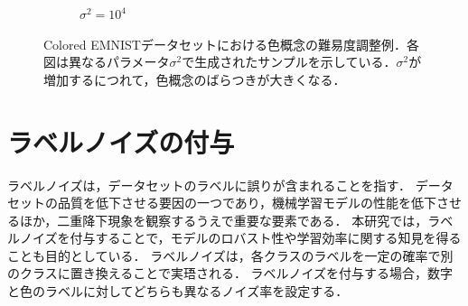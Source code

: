 \begin{figure}[H]
\begin{subfigure}[b]{0.48\textwidth}
        \caption{$\sigma^2 = 10^4$}
        \label{fig:coloredeminst_10000}
    \end{subfigure}
    \caption{Colored EMNISTデータセットにおける色概念の難易度調整例．各図は異なるパラメータ$\sigma^2$で生成されたサンプルを示している．$\sigma^2$が増加するにつれて，色概念のばらつきが大きくなる．}
    \label{fig:coloredeminsts}
\end{figure}

\section{ラベルノイズの付与}
ラベルノイズは，データセットのラベルに誤りが含まれることを指す．
データセットの品質を低下させる要因の一つであり，機械学習モデルの性能を低下させるほか，二重降下現象を観察するうえで重要な要素である．
本研究では，ラベルノイズを付与することで，モデルのロバスト性や学習効率に関する知見を得ることも目的としている．
ラベルノイズは，各クラスのラベルを一定の確率で別のクラスに置き換えることで実珸される．
ラベルノイズを付与する場合，数字と色のラベルに対してどちらも異なるノイズ率を設定する．
